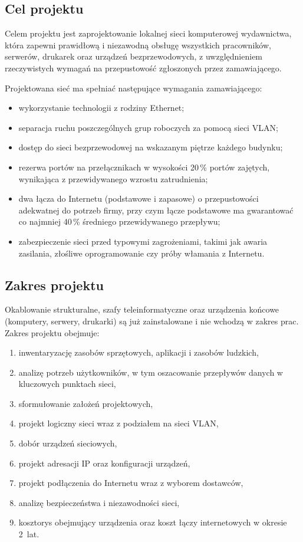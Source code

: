 \documentclass[12pt,a4paper]{article}
\begin{document}
\subsection{Cel projektu}

Celem projektu jest zaprojektowanie lokalnej sieci komputerowej wydawnictwa,
która zapewni prawidłową i niezawodną obsługę wszystkich pracowników, serwerów,
drukarek oraz urządzeń bezprzewodowych, z uwzględnieniem rzeczywistych
wymagań na przepustowość zgłoszonych przez zamawiającego.

Projektowana sieć ma spełniać następujące wymagania zamawiającego:
\begin{itemize}
  \item wykorzystanie technologii z rodziny Ethernet;
  \item separacja ruchu poszczególnych grup roboczych za pomocą sieci VLAN;
  \item dostęp do sieci bezprzewodowej na wskazanym piętrze każdego budynku;
  \item rezerwa portów na przełącznikach w wysokości 20\,\% portów zajętych,
  wynikająca z przewidywanego wzrostu zatrudnienia;
  \item dwa łącza do Internetu (podstawowe i zapasowe) o przepustowości
  adekwatnej do potrzeb firmy, przy czym łącze podstawowe ma gwarantować
  co najmniej 40\,\% średniego przewidywanego przepływu;
  \item zabezpieczenie sieci przed typowymi zagrożeniami, takimi jak awaria
  zasilania, złośliwe oprogramowanie czy próby włamania z Internetu.
\end{itemize}

\subsection{Zakres projektu}

Okablowanie strukturalne, szafy teleinformatyczne oraz urządzenia końcowe
(komputery, serwery, drukarki) są już zainstalowane i nie wchodzą w zakres
prac. Zakres projektu obejmuje:
\begin{enumerate}
  \item inwentaryzację zasobów sprzętowych, aplikacji i zasobów ludzkich,
  \item analizę potrzeb użytkowników, w tym oszacowanie przepływów danych
  w kluczowych punktach sieci,
  \item sformułowanie założeń projektowych,
  \item projekt logiczny sieci wraz z podziałem na sieci VLAN,
  \item dobór urządzeń sieciowych,
  \item projekt adresacji IP oraz konfiguracji urządzeń,
  \item projekt podłączenia do Internetu wraz z wyborem dostawców,
  \item analizę bezpieczeństwa i niezawodności sieci,
  \item kosztorys obejmujący urządzenia oraz koszt łączy internetowych
  w okresie 2~lat.
\end{enumerate}
\end{document}
